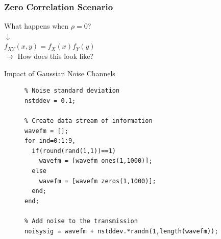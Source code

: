 \documentclass[10pt]{beamer}
\begin{document}

\frame
{
  \frametitle{Zero Correlation Scenario}
  
  \centering
  What happens when $\rho=0$?\\
  $\downarrow$\\
  $f_{XY}(x,y)=f_{X}(x)f_{Y}(y)$\\
  \vspace*{1cm}
  $\rightarrow$ How does this look like?
  
  
  }
  
  


\begin{frame}[fragile]{Impact of Gaussian Noise Channels}
  
\begin{figure}
\centering
\begin{minipage}[framed]{0.9\textwidth}
\begin{lstlisting}
% Noise standard deviation
nstddev = 0.1;

% Create data stream of information
wavefm = [];
for ind=0:1:9,
  if(round(rand(1,1))==1)
    wavefm = [wavefm ones(1,1000)];
  else
    wavefm = [wavefm zeros(1,1000)];  
  end;
end;

% Add noise to the transmission
noisysig = wavefm + nstddev.*randn(1,length(wavefm));
\end{lstlisting}
\end{minipage}
\captionsetup{labelformat=empty}
\end{figure}

\end{frame}

\end{document}
